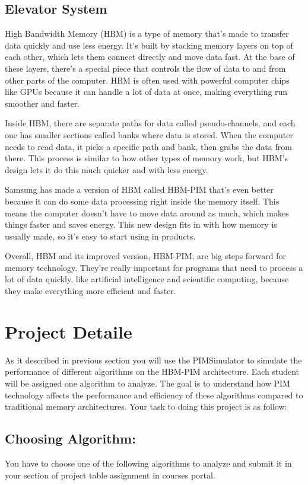 \documentclass[12pt]{article}
\begin{document}
\subsection{Elevator System}
High Bandwidth Memory (HBM) is a type of memory that's made to transfer data quickly and use less energy. It's built by stacking memory layers on top of each other, which lets them connect directly and move data fast. At the base of these layers, there's a special piece that controls the flow of data to and from other parts of the computer. HBM is often used with powerful computer chips like GPUs because it can handle a lot of data at once, making everything run smoother and faster.

Inside HBM, there are separate paths for data called pseudo-channels, and each one has smaller sections called banks where data is stored. When the computer needs to read data, it picks a specific path and bank, then grabs the data from there. This process is similar to how other types of memory work, but HBM's design lets it do this much quicker and with less energy.

Samsung has made a version of HBM called HBM-PIM that's even better because it can do some data processing right inside the memory itself. This means the computer doesn't have to move data around as much, which makes things faster and saves energy. This new design fits in with how memory is usually made, so it's easy to start using in products.

Overall, HBM and its improved version, HBM-PIM, are big steps forward for memory technology. They're really important for programs that need to process a lot of data quickly, like artificial intelligence and scientific computing, because they make everything more efficient and faster.



\section{Project Detaile}
As it described in previous section you will use the PIMSimulator to simulate the performance of different algorithms on the HBM-PIM architecture. Each student will be assigned one algorithm to analyze. The goal is to understand how PIM technology affects the performance and efficiency of these algorithms compared to traditional memory architectures. Your task to doing this project is as follow:

\subsection{Choosing Algorithm:}
You have to choose one of the following algorithms to analyze and submit it in your section of project table assignment in courses portal.
\end{document}
